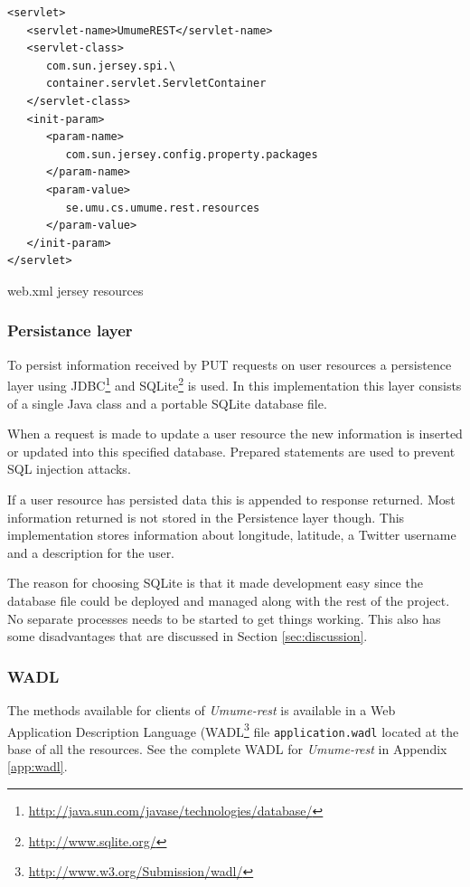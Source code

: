 \documentclass[titlepage, twocolumn, a4paper, 10pt]{article}
\begin{document}
\begin{code}
  \begin{footnotesize}
\begin{verbatim}
<servlet>
   <servlet-name>UmumeREST</servlet-name>
   <servlet-class>
      com.sun.jersey.spi.\
      container.servlet.ServletContainer
   </servlet-class>
   <init-param>
      <param-name>
         com.sun.jersey.config.property.packages
      </param-name>
      <param-value>
         se.umu.cs.umume.rest.resources
      </param-value>
   </init-param>
</servlet>
\end{verbatim}
  \end{footnotesize}
  \caption{web.xml jersey resources}\label{code:webxml}
\end{code}

\subsubsection{Persistance layer}\label{sec:persistance}
To persist information received by PUT requests on user resources a
persistence layer using
JDBC\footnote{\url{http://java.sun.com/javase/technologies/database/}}
and SQLite\footnote{\url{http://www.sqlite.org/}} is used. In this
implementation this layer consists of a single Java class and a
portable SQLite database file.

When a request is made to update a user resource the new information
is inserted or updated into this specified database. Prepared
statements are used to prevent SQL injection attacks.

If a user resource has persisted data this is appended to response
returned. Most information returned is not stored in the Persistence
layer though. This implementation stores information about longitude,
latitude, a Twitter username and a description for the user.

The reason for choosing SQLite is that it made development easy since
the database file could be deployed and managed along with the rest of
the project. No separate processes needs to be started to get things
working. This also has some disadvantages that are discussed in
Section \ref{sec:discussion}.

\subsubsection{WADL}
The methods available for clients of \textit{Umume-rest} is available
in a Web Application Description Language
(WADL\footnote{\url{http://www.w3.org/Submission/wadl/}} file
\texttt{application.wadl} located at the base of all the resources.
See the complete WADL for \textit{Umume-rest} in Appendix
\ref{app:wadl}.
\end{document}
